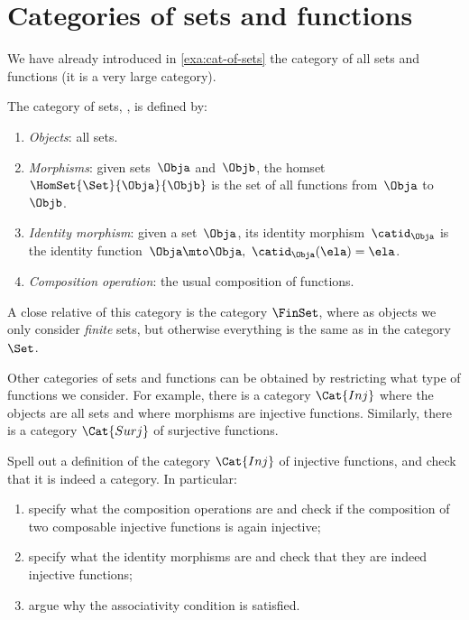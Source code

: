 
\section{Categories of sets and functions}

We have already introduced in \cref{exa:cat-of-sets} the category of all sets and functions (it is a very large category). 

\begin{ctdefinition}
    \label{def:Set}
    The category of sets, \iindex{\Set}, is defined by:
    \begin{enumerate}
        \item \emph{Objects}: all sets.
        \item \emph{Morphisms}: given sets~$\Obja$ and~$\Objb$, the homset~$\HomSet{\Set}{\Obja}{\Objb}$ is the set of all functions from~$\Obja$ to~$\Objb$.
        \item \emph{Identity morphism}: given a set~$\Obja$, its identity morphism~$\catid_\Obja$ is the identity function~$\Obja \mto \Obja, \ \catid_\Obja(\ela) = \ela$.
        \item \emph{Composition operation}: the usual composition of functions.
    \end{enumerate}
\end{ctdefinition}

A close relative of this category is the category $\FinSet$, where as objects we only consider \emph{finite} sets, but otherwise everything is the same as in the category $\Set$. 

Other categories of sets and functions can be obtained by restricting what type of functions we consider. For example, there is a category $\Cat{Inj}$ where the objects are all sets and where morphisms are injective functions. Similarly, there is a category $\Cat{Surj}$ of surjective functions. 

\begin{exercise}
Spell out a definition of the category $\Cat{Inj}$ of injective functions, and check that it is indeed a category. In particular:
\begin{enumerate}
\item specify what the composition operations are and check if the composition of two composable injective functions is again injective;
\item specify what the identity morphisms are and check that they are indeed injective functions;
\item argue why the associativity condition is satisfied. 
\end{enumerate}
\end{exercise}

